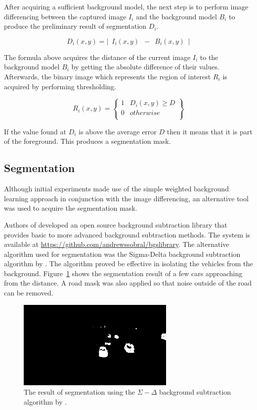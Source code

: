 \documentclass[conference]{IEEEtran}
\begin{document}
After acquiring a sufficient background model, the next step is to perform image differencing between the captured image $I_i$ and the background model $B_i$ to produce the preliminary result of segmentation $D_i$.

$$
D_i(x,y) =  | \enspace I_i(x,y) \enspace - \enspace B_i(x,y) \enspace |
$$

The formula above acquires the distance of the current image $I_i$ to the background model $B_i$ by getting the absolute difference of their values. Afterwards, the binary image which represents the region of interest $R_i$ is acquired by performing thresholding.

$$
R_i(x,y) = \left\{
		\begin{array}{lr}
        1 & D_i(x,y) \geq D \\
        0 & otherwise\\
        \end{array}\right\}
$$

If the value found at $D_i$ is above the average error $D$ then it means that it is part of the foreground. This produces a segmentation mask.

\subsection{Segmentation}

Although initial experiments made use of the simple weighted background learning approach in conjunction with the image differencing, an alternative tool was used to acquire the segmentation mask.

Authors of \cite{Sobral} developed an open source background subtraction library that provides basic to more advanced background subtraction methods. The system is available at \url{https://github.com/andrewssobral/bgslibrary}. The alternative algorithm used for segmentation was the Sigma-Delta background subtraction algorithm by \cite{Manzanera}. The algorithm proved be effective in isolating the vehicles from the background. Figure~\ref{fig_segmentation} shows the segmentation result of a few cars approaching from the distance. A road mask was also applied so that noise outside of the road can be removed.

\begin{figure}[!ht]
\centering
\includegraphics[width=3in]{segmented_mask_sample.png}
\caption{The result of segmentation using the $\Sigma-\Delta$ background subtraction algorithm by \cite{Manzanera}.}
\label{fig_segmentation}
\end{figure}
\end{document}
